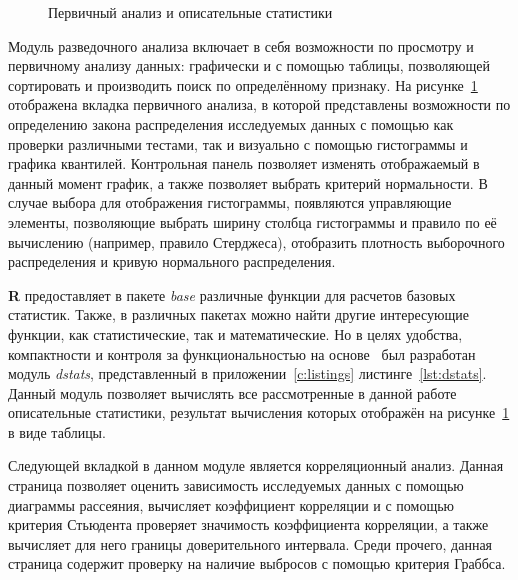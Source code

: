 \begin{figure}[ht]
\caption{Первичный анализ и описательные статистики}
\label{img:mod_basis}
\end{figure}
Модуль разведочного анализа включает в себя возможности по просмотру и первичному анализу данных: графически и с помощью таблицы, позволяющей сортировать и производить поиск по определённому признаку. На рисунке~\ref{img:mod_basis} отображена вкладка первичного анализа, в которой представлены возможности по определению закона распределения исследуемых данных с помощью как проверки различными тестами, так и визуально с помощью гистограммы и графика квантилей. Контрольная панель позволяет изменять отображаемый в данный момент график, а также позволяет выбрать критерий нормальности. В случае выбора для отображения гистограммы, появляются управляющие элементы, позволяющие выбрать ширину столбца гистограммы и правило по её вычислению (например, правило Стерджеса), отобразить плотность выборочного распределения и кривую нормального распределения.

\textbf{R} предоставляет в пакете \textit{base} различные функции для расчетов базовых статистик. Также, в различных пакетах можно найти другие интересующие функции, как статистические, так и математические. Но в целях удобства, компактности и контроля за функциональностью на основе~\cite{Eliseeva1995, Cramer1997} был разработан модуль \textit{dstats}, представленный в приложении~\ref{c:listings} листинге~\ref{lst:dstats}. Данный модуль позволяет вычислять все рассмотренные в данной работе описательные статистики, результат вычисления которых отображён на рисунке~\ref{img:mod_basis} в виде таблицы.

Следующей вкладкой в данном модуле является корреляционный анализ. Данная страница позволяет оценить зависимость исследуемых данных с помощью диаграммы рассеяния, вычисляет коэффициент корреляции и с помощью критерия Стьюдента проверяет значимость коэффициента корреляции, а также вычисляет для него границы доверительного интервала. Среди прочего, данная страница содержит проверку на наличие выбросов с помощью критерия Граббса.


